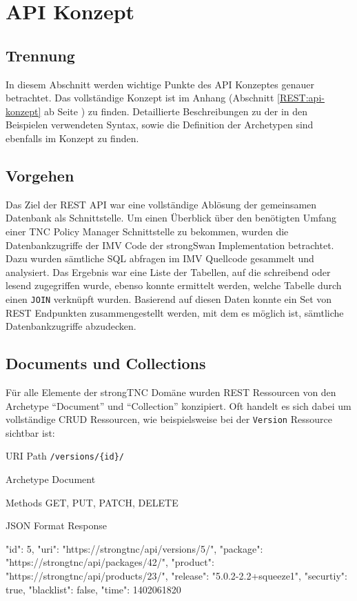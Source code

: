 \chapter{API Konzept}
\section{Trennung}

In diesem Abschnitt werden wichtige Punkte des API Konzeptes genauer betrachtet.
Das vollständige Konzept ist im Anhang (Abschnitt \ref{REST:api-konzept} ab
Seite \pageref{REST:api-konzept}) zu finden. Detaillierte Beschreibungen zu der
in den Beispielen verwendeten Syntax, sowie die Definition der Archetypen sind
ebenfalls im Konzept zu finden.

\section{Vorgehen}
Das Ziel der REST API war eine vollständige Ablösung der gemeinsamen Datenbank
als Schnittstelle. Um einen Überblick über den benötigten Umfang einer TNC
Policy Manager Schnittstelle zu bekommen, wurden die Datenbankzugriffe der IMV
Code der strongSwan Implementation betrachtet. Dazu wurden sämtliche SQL
abfragen im IMV Quellcode gesammelt und analysiert. Das Ergebnis war eine Liste
der Tabellen, auf die schreibend oder lesend zugegriffen wurde, ebenso konnte
ermittelt werden, welche Tabelle durch einen \texttt{JOIN} verknüpft wurden.
Basierend auf diesen Daten konnte ein Set von REST Endpunkten zusammengestellt
werden, mit dem es möglich ist, sämtliche Datenbankzugriffe abzudecken.

\section{Documents und Collections}
Für alle Elemente der strongTNC Domäne wurden REST Ressourcen von den Archetype
\enquote{Document} und \enquote{Collection} konzipiert. Oft handelt es sich
dabei um vollständige CRUD Ressourcen, wie beispielsweise bei der
\texttt{Version} Ressource sichtbar ist:

\begin{mdframed}[style=def]
\begin{description*}
	\item[URI Path] \texttt{/versions/\{id\}/}
	\item[Archetype] Document
	\item[Methods] GET, PUT, PATCH, DELETE
	\item[JSON Format Response] \hfill
\begin{jsoncode}
{
	"id": 5,
	"uri": "https://strongtnc/api/versions/5/",
	"package": "https://strongtnc/api/packages/42/",
	"product": "https://strongtnc/api/products/23/",
	"release": "5.0.2-2.2+squeeze1",
	"securtiy": true,
	"blacklist": false,
	"time": 1402061820
}
\end{jsoncode}
\end{description*}
\end{mdframed}

